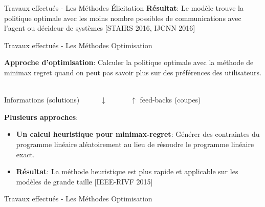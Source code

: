 \documentclass{beamer}
\begin{document}
{{\begin{frame}{Travaux effectués - Les Méthodes Élicitation}
\textbf{Résultat}: Le modèle trouve la politique optimale avec les moins
nombre possibles de communications avec l’agent ou décideur de
systèmes [STAIRS 2016, IJCNN 2016]

\end{frame}

\begin{frame}{Travaux effectués - Les Méthodes Optimisation}


\textbf{Approche d’optimisation}: Calculer la politique optimale avec la méthode de minimax regret quand on peut pas savoir plus sur des préférences des utilisateurs.

\vspace{0.2cm}

\begin{center}
	 \\
	\vspace{0.1cm}
	Informations (solutions)~~~~~ $\downarrow$ ~~~~~ $\uparrow$ feed-backs (coupes)\\
	\vspace{0.1cm}

\end{center}

\vspace{0.2cm}

\textbf{Plusieurs approches}:
\begin{itemize}
\item \textbf{Un calcul heuristique pour minimax-regret}: Générer des contraintes du programme linéaire aléatoirement au lieu de résoudre le programme linéaire exact.
\item \textbf{Résultat}: La méthode heuristique est plus rapide et applicable sur les modèles de grande taille [IEEE-RIVF 2015]
\end{itemize}

\end{frame}

\begin{frame}{Travaux effectués - Les Méthodes Optimisation}


\end{frame}}}
\end{document}
